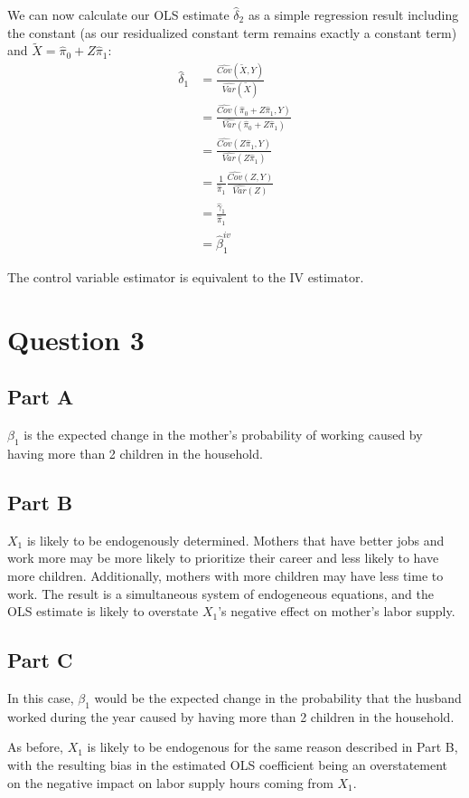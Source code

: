 \documentclass[11pt]{article} %
\begin{document}
We can now calculate our OLS estimate $\hat{\delta}_2$ as a simple regression result including the constant (as our residualized constant term remains exactly a constant term) and $\tilde{X} =\hat{\pi}_0 + Z \hat{\pi}_1 $:
\begin{align*}
\hat{\delta}_1 &= \frac{\hat{Cov}(\tilde{X},Y)}{\hat{Var}(\tilde{X})}\\
&=\frac{\hat{Cov}(\hat{\pi}_0 + Z \hat{\pi}_1,Y)}{\hat{Var}(\hat{\pi}_0 + Z \hat{\pi}_1)}\\
&= \frac{\hat{Cov}(Z \hat{\pi}_1,Y)}{\hat{Var}( Z \hat{\pi}_1)}\\
&= \frac{1}{\hat{\pi}_1}\frac{\hat{Cov}(Z ,Y)}{\hat{Var}( Z )}\\
&= \frac{\hat{\gamma}_1}{\hat{\pi}_1}\\
&= \hat{\beta}_1^{iv}
\end{align*}

The control variable estimator is equivalent to the IV estimator.

\section{Question 3}

\subsection{Part A}
$\beta_1$ is the expected change in the mother's probability of working caused by having more than 2 children in the household.
\subsection{Part B}
$X_1$ is likely to be endogenously determined. Mothers that have better jobs and work more may be more likely to prioritize their career and less likely to have more children. Additionally, mothers with more children may have less time to work. The result is a simultaneous system of endogeneous equations, and the OLS estimate is likely to overstate $X_1$'s negative effect on mother's labor supply.
\subsection{Part C}
In this case, $\beta_1$ would be the expected change in the probability that the husband worked during the year caused by having more than 2 children in the household.

As before, $X_1$ is likely to be endogenous for the same reason described in Part B, with the resulting bias in the estimated OLS coefficient being an overstatement on the negative impact on labor supply hours coming from $X_1$.
\end{document}
